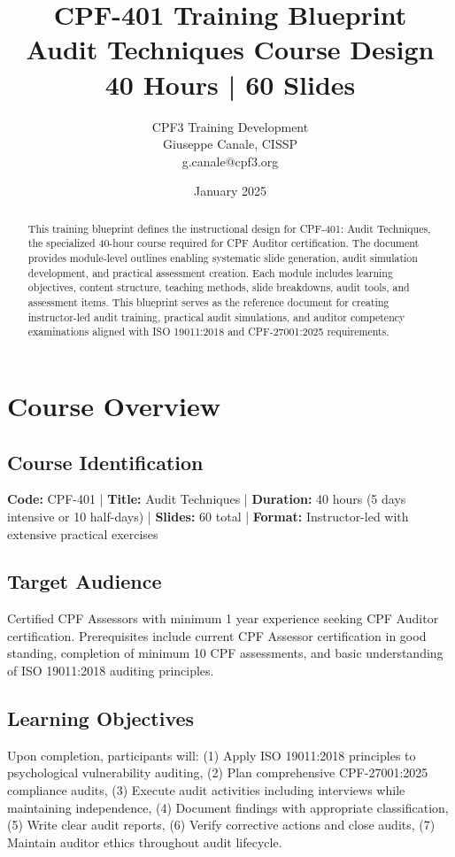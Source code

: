 \documentclass[11pt,a4paper]{article}
\title{\textbf{CPF-401 Training Blueprint}\\
\large Audit Techniques Course Design\\
40 Hours | 60 Slides}
\author{CPF3 Training Development\\
Giuseppe Canale, CISSP\\
\small g.canale@cpf3.org}
\date{January 2025}
\begin{document}
\maketitle

\begin{abstract}
This training blueprint defines the instructional design for CPF-401: Audit Techniques, the specialized 40-hour course required for CPF Auditor certification. The document provides module-level outlines enabling systematic slide generation, audit simulation development, and practical assessment creation. Each module includes learning objectives, content structure, teaching methods, slide breakdowns, audit tools, and assessment items. This blueprint serves as the reference document for creating instructor-led audit training, practical audit simulations, and auditor competency examinations aligned with ISO 19011:2018 and CPF-27001:2025 requirements.
\end{abstract}

\tableofcontents
\newpage

\section{Course Overview}

\subsection{Course Identification}
\textbf{Code:} CPF-401 | \textbf{Title:} Audit Techniques | \textbf{Duration:} 40 hours (5 days intensive or 10 half-days) | \textbf{Slides:} 60 total | \textbf{Format:} Instructor-led with extensive practical exercises

\subsection{Target Audience}
Certified CPF Assessors with minimum 1 year experience seeking CPF Auditor certification. Prerequisites include current CPF Assessor certification in good standing, completion of minimum 10 CPF assessments, and basic understanding of ISO 19011:2018 auditing principles.

\subsection{Learning Objectives}
Upon completion, participants will: (1) Apply ISO 19011:2018 principles to psychological vulnerability auditing, (2) Plan comprehensive CPF-27001:2025 compliance audits, (3) Execute audit activities including interviews while maintaining independence, (4) Document findings with appropriate classification, (5) Write clear audit reports, (6) Verify corrective actions and close audits, (7) Maintain auditor ethics throughout audit lifecycle.
\end{document}
